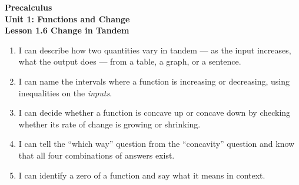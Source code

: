 \documentclass[10pt]{article}
\begin{document}
\vspace{-0.8in}

\begin{center}
  {\color{white}\textbf{\LARGE Precalculus}}\\[4pt]
  {\color{lilacmid}\large\textbf{Unit 1: Functions and Change}}\\[6pt]
  {\color{white}\textbf{\large Lesson 1.6 \quad Change in Tandem}}
\end{center}

\vspace{0.22in}
\namedateperiod
\vspace{0.18in}

\begin{learningtargetbox}
\small
\begin{enumerate}[leftmargin=1.5em, itemsep=5pt]
  \item I can describe how two quantities vary in tandem --- as the input
        increases, what the output does --- from a table, a graph, or a
        sentence.
  \item I can name the intervals where a function is increasing or decreasing,
        using inequalities on the \textit{inputs}.
  \item I can decide whether a function is concave up or concave down by
        checking whether its rate of change is growing or shrinking.
  \item I can tell the ``which way'' question from the ``concavity'' question
        and know that all four combinations of answers exist.
  \item I can identify a zero of a function and say what it means in context.
\end{enumerate}
\end{learningtargetbox}

\vspace{0.14in}
\end{document}
